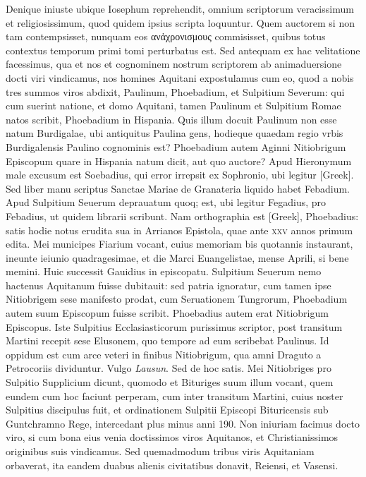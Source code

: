 Denique iniuste
ubique Iosephum reprehendit, omnium scriptorum veracissimum
et religiosissimum, quod quidem ipsius scripta loquuntur.
Quem
auctorem si non tam contempsisset, nunquam eos
 \textgreek{ανἀχρονισμους}
 commisisset,
quibus totus contextus temporum primi tomi perturbatus
est.
Sed antequam ex hac velitatione facessimus, qua et nos et cognominem
nostrum scriptorem ab animaduersione docti viri vindicamus,
nos homines Aquitani expostulamus cum eo, quod a nobis
tres summos viros abdixit, Paulinum, Phoebadium, et Sulpitium
Severum:
qui cum suerint natione, et domo Aquitani, tamen
Paulinum et Sulpitium Romae natos scribit, Phoebadium in Hispania.
Quis illum docuit Paulinum non esse natum Burdigalae, ubi
antiquitus Paulina gens, hodieque quaedam regio vrbis Burdigalensis
Paulino cognominis est?
Phoebadium autem Aginni Nitiobrigum
Episcopum quare in Hispania natum dicit, aut quo auctore?
Apud Hieronymum male excusum est Soebadius, qui error irrepsit
ex Sophronio, ubi legitur \textgreek{[Greek]}.
Sed liber manu scriptus
Sanctae Mariae de Granateria liquido habet Febadium.
Apud Sulpitium
Seuerum deprauatum quoq; est, ubi legitur Fegadius, pro
Febadius, ut quidem librarii scribunt.
Nam orthographia est \textgreek{[Greek]},
Phoebadius: satis hodie notus erudita sua in Arrianos Epistola,
quae ante \textsc{xxv} annos primum edita.
Mei municipes Fiarium vocant,
cuius memoriam bis quotannis instaurant, ineunte ieiunio
quadragesimae, et die Marci Euangelistae, mense Aprili, si bene
memini.
Huic successit Gauidius in episcopatu.
Sulpitium Seuerum
nemo hactenus Aquitanum fuisse dubitauit: sed patria ignoratur,
cum tamen ipse Nitiobrigem sese manifesto prodat, cum Seruationem
Tungrorum, Phoebadium autem suum Episcopum fuisse scribit.
Phoebadius autem erat Nitiobrigum Episcopus.
Iste Sulpitius
Ecclasiasticorum purissimus scriptor, post transitum Martini recepit
sese Elusonem, quo tempore ad eum scribebat Paulinus.
Id oppidum est cum arce veteri in finibus Nitiobrigum, qua amni Draguto
a Petrocoriis dividuntur.
Vulgo \textit{Lausun}.
Sed de hoc satis.
Mei
Nitiobriges pro Sulpitio Supplicium dicunt, quomodo et Bituriges
suum illum vocant, quem eundem cum hoc faciunt perperam,
cum inter transitum Martini, cuius noster Sulpitius discipulus fuit,
et ordinationem Sulpitii Episcopi Bituricensis sub Guntchramno
Rege, intercedant plus minus anni 190.
Non iniuriam facimus
docto viro, si cum bona eius venia doctissimos viros Aquitanos,
et Christianissimos originibus suis vindicamus.
Sed quemadmodum tribus viris Aquitaniam orbaverat, ita eandem duabus
alienis civitatibus donavit, Reiensi, et Vasensi.

